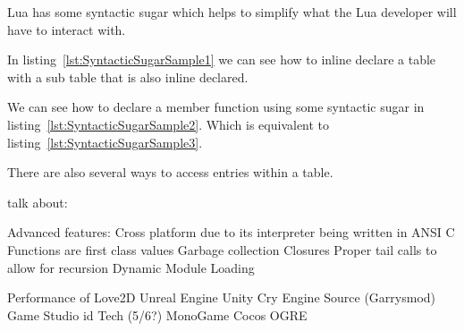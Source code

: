 \documentclass[11pt,a4paper,titlepage]{article}
\begin{document}
	\newpage
	Lua has some syntactic sugar which helps to simplify what the Lua developer will have to interact with.

	
	In listing~\ref{lst:SyntacticSugarSample1} we can see how to inline declare a table with a sub table that is also inline declared.

	
	We can see how to declare a member function using some syntactic sugar in listing~\ref{lst:SyntacticSugarSample2}. Which is equivalent to listing~\ref{lst:SyntacticSugarSample3}.

	

	There are also several ways to access entries within a table.

	

	\newpage

	talk about:

	Advanced features:
	Cross platform due to its interpreter being written in ANSI C
	Functions are first class values
	Garbage collection
	Closures
	Proper tail calls to allow for recursion
	Dynamic Module Loading

	\newpage
	
		Performance of
			Love2D
			Unreal 
			Engine 
			Unity 
			Cry Engine 
			Source (Garrysmod)
			Game Studio
			id Tech (5/6?)
			MonoGame
			Cocos
			OGRE
			
\newpage
\printbibliography{}
\end{document}
